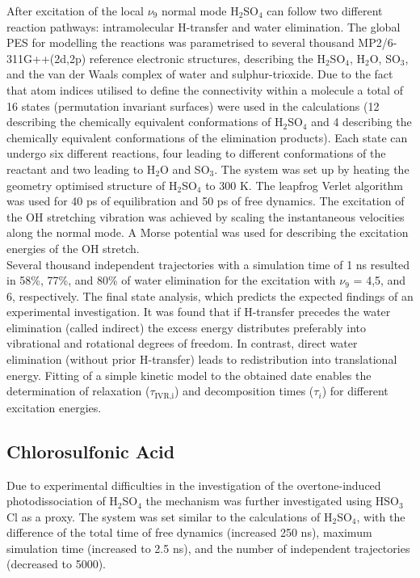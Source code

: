 \documentclass[journal=jacsat,manuscript=article]{achemso}
\begin{document}
\noindent
After excitation of the local $\nu_9$ normal mode H$_2$SO$_4$ can
follow two different reaction pathways: intramolecular H-transfer and
water elimination. The global PES for modelling the reactions was
parametrised to several thousand MP2/6-311G++(2d,2p) reference
electronic structures, describing the H$_2$SO$_4$, H$_2$O, SO$_3$, and
the van der Waals complex of water and sulphur-trioxide. Due to the
fact that atom indices utilised to define the connectivity within a
molecule a total of 16 states (permutation invariant surfaces) were
used in the calculations (12 describing the chemically equivalent
conformations of H$_2$SO$_4$ and 4 describing the chemically
equivalent conformations of the elimination products). Each state can
undergo six different reactions, four leading to different
conformations of the reactant and two leading to H$_2$O and
SO$_3$. The system was set up by heating the geometry optimised
structure of H$_2$SO$_4$ to 300 K. The leapfrog Verlet algorithm was
used for 40 ps of equilibration and 50 ps of free dynamics. The
excitation of the OH stretching vibration was achieved by scaling the
instantaneous velocities along the normal mode. A Morse potential was
used for describing the excitation energies of the OH stretch.\\

\noindent
Several thousand independent trajectories with a simulation time of 1
ns resulted in 58\%, 77\%, and 80\% of water elimination for the
excitation with $\nu_9$ = 4,5, and 6, respectively. The final state
analysis, which predicts the expected findings of an experimental
investigation. It was found that if H-transfer precedes the water
elimination (called indirect) the excess energy distributes preferably
into vibrational and rotational degrees of freedom. In contrast,
direct water elimination (without prior H-transfer) leads to
redistribution into translational energy. Fitting of a simple kinetic
model to the obtained date enables the determination of relaxation
($\tau_{\text{IVR,i}}$) and decomposition times ($\tau_i$) for
different excitation energies.\\

\subsection{Chlorosulfonic Acid}

\noindent
Due to experimental
difficulties in the investigation of the overtone-induced
photodissociation of H$_2$SO$_4$\cite{lane.jpca.2007.vibphotodis,gupta.pccp.2010.vibphotodis,lane.kjaergaard.jpca.2007.vibphotodis} the mechanism was further
investigated using HSO$_3$Cl as a
proxy\cite{lane.kjaergaard.jpca.2007.vibphotodis,gupta.pccp.2010.vibphotodis,reyesbrickel.pccp.2016.msarmd}. The system was set similar
to the calculations of H$_2$SO$_4$, with the difference of the total
time of free dynamics (increased 250 ns), maximum simulation time
(increased to 2.5 ns), and the number of independent trajectories
(decreased to 5000).\\
\end{document}

